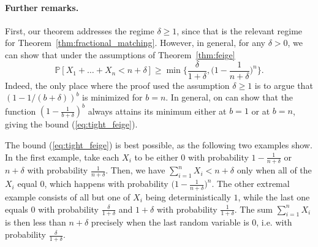 \documentclass[10pt]{article}
\newcommand{\Pb}{\mathbb P}
\begin{document}
\paragraph{Further remarks.} First, our theorem addresses the regime $\delta\geq 1$, since that is the relevant regime for Theorem~\ref{thm:fractional_matching}. However, in general, for any $\delta>0$, we can show that under the assumptions of Theorem~\ref{thm:feige}
\begin{equation}\label{eq:tight_feige}
    \Pb[X_1+\dots+X_n<n+\delta]\geq \min\Big\{\frac{\delta}{1+\delta}, \Big(1-\frac{1}{n+\delta}\Big)^n\Big\}.
\end{equation}
Indeed, the only place where the proof used the assumption $\delta\geq 1$ is to argue that $(1-1/(b+\delta))^b$ is minimized for $b=n$. In general, on can show that the function $(1-\frac{1}{b+\delta})^b$ always attains its minimum either at $b=1$ or at $b=n$, giving the bound (\ref{eq:tight_feige}).

The bound (\ref{eq:tight_feige}) is best possible, as the following two examples show. In the first example, take each $X_i$ to be either $0$ with probability $1-\frac{1}{n+\delta}$ or $n+\delta$ with probability $\frac{1}{n+\delta}$. Then, we have $\sum_{i=1}^n X_i<n+\delta$ only when all of the $X_i$ equal $0$, which happens with probability $\big(1-\frac{1}{n+\delta}\big)^n$. The other extremal example consists of all but one of $X_i$ being deterministically $1$, while the last one equals $0$ with probability $\frac{\delta}{1+\delta}$ and $1+\delta$ with probability $\frac{1}{1+\delta}$. The sum $\sum_{i=1}^n X_i$ is then less than $n+\delta$ precisely when the last random variable is $0$, i.e. with probability $\frac{\delta}{1+\delta}$.



\end{document}
